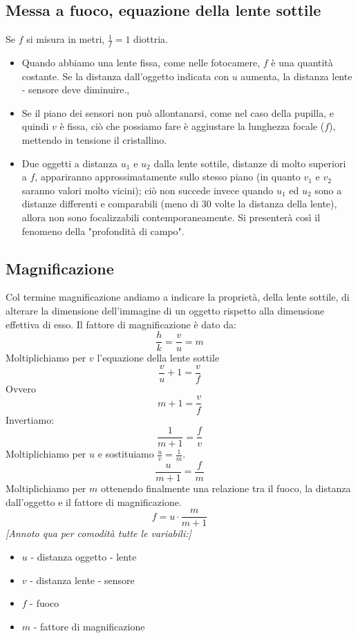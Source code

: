 \documentclass{report}
\begin{document}
	\subsection{Messa a fuoco, equazione della lente sottile}
	Se $f$ si misura in metri, $\frac{1}{f} = 1$ diottria.
	\begin{itemize}
		\item Quando abbiamo una lente fissa, come nelle fotocamere, $f$ è una quantità costante. Se la distanza dall'oggetto indicata con $u$ aumenta, la distanza lente -  sensore deve diminuire., 
		\item Se il piano dei sensori non può allontanarsi, come nel caso della pupilla, e quindi $v$ è fissa, ciò che possiamo fare è aggiustare la lunghezza focale ($f$), mettendo in tensione il cristallino. 
		\item Due oggetti a distanza $u_1$ e $u_2$ dalla lente sottile, distanze di molto superiori a $f$, appariranno approssimatamente sullo stesso piano (in quanto $v_1$ e $v_2$ saranno valori molto vicini);
		      ciò non succede invece quando $u_1$ ed $u_2$ sono a distanze differenti e comparabili (meno di 30 volte la distanza della lente), allora non sono focalizzabili contemporaneamente. Si presenterà così il fenomeno della "profondità di campo".
	\end{itemize}
	\subsection{Magnificazione}
	Col termine magnificazione andiamo a indicare la proprietà, della lente sottile, di alterare la dimensione dell'immagine di un oggetto rispetto alla dimensione effettiva di esso.
	Il fattore di magnificazione è dato da: $$\frac{h}{k} = \frac{v}{u} = m$$
	Moltiplichiamo per $v$ l'equazione della lente sottile
	$$
	\frac{v}{u} + 1 = \frac{v}{f}
	$$
	Ovvero
	$$
	m + 1 = \frac{v}{f}
	$$
	Invertiamo:
	$$
	\frac{1}{m+1} = \frac{f}{v}
	$$
	Moltiplichiamo per $u$ e sostituiamo $\frac{u}{v} = \frac{1}{m}$.
	$$
	\frac{u}{m+1} = \frac{f}{m}
	$$
	Moltiplichiamo per $m$ ottenendo finalmente una relazione tra il fuoco, la distanza dall'oggetto e il fattore di magnificazione.
	$$
	f = u \cdot \frac{m}{m+1}
	$$
	\textit{[Annoto qua per comodità tutte le variabili:]}
	\begin{itemize}
		\item $u$ - distanza oggetto - lente
		\item $v$ - distanza lente - sensore
		\item $f$ - fuoco
		\item $m$ - fattore di magnificazione
	\end{itemize}
		
\end{document}
